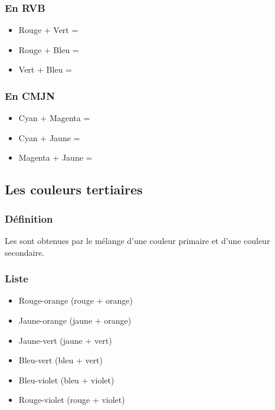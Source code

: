 \subsubsection{En RVB}

\begin{itemize}
    \item Rouge + Vert = 
    \item Rouge + Bleu = 
    \item Vert + Bleu = 
\end{itemize}

\subsubsection{En CMJN}

\begin{itemize}
    \item Cyan + Magenta = 
    \item Cyan + Jaune = 
    \item Magenta + Jaune = 
\end{itemize}

\subsection{Les couleurs tertiaires}

\subsubsection{Définition}

Les  sont obtenues par le mélange d'une couleur primaire et d'une couleur secondaire.

\subsubsection{Liste}

\begin{itemize}
    \item Rouge-orange (rouge + orange)
    \item Jaune-orange (jaune + orange)
    \item Jaune-vert (jaune + vert)
    \item Bleu-vert (bleu + vert)
    \item Bleu-violet (bleu + violet)
    \item Rouge-violet (rouge + violet)
\end{itemize}

